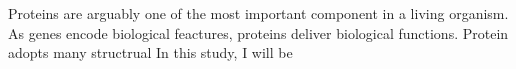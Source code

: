 Proteins are arguably one of the most important component in a living organism. As genes encode biological feactures, proteins deliver biological functions. Protein adopts many structrual   In this study, I will be 